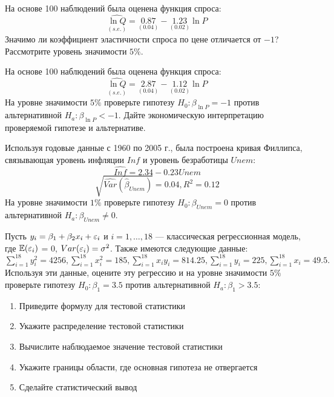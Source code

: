 \documentclass[pdftex,11pt,openany]{book}
\begin{document}
\begin{solution}
\end{solution}


\begin{problem} На основе 100 наблюдений была оценена функция спроса:
\[
\underset{(s.e.)}{\widehat{\ln Q}} = \underset{(0.04)}{0.87} - \underset{(0.02)}{1.23}\ln P
\]
Значимо ли коэффициент эластичности спроса по цене отличается от $-1$? Рассмотрите уровень значимости $5\%$.
\end{problem}

\begin{solution}
\end{solution}


\begin{problem}
 На основе 100 наблюдений была оценена функция спроса: 
\[
\underset{(s.e.)}{\widehat{\ln Q}} = \underset{(0.04)}{2.87} - \underset{(0.02)}{1.12}\ln P
\]
На уровне значимости $5\%$ проверьте гипотезу  $H_0: \beta_{\ln P} = - 1$ против альтернативной $H_a: \beta_{\ln P} < -1$. Дайте экономическую интерпретацию проверяемой гипотезе и альтернативе.
\end{problem}

\begin{solution}
\end{solution}


\begin{problem}
 Используя годовые данные с 1960 по 2005 г., была построена кривая Филлипса, связывающая уровень инфляции $Inf$ и уровень безработицы $Unem$: 
\[
\widehat{Inf} = 2.34 - 0.23Unem 
\]
\[
\sqrt{\widehat{Var}(\hat{\beta}_{Unem})} = 0.04, R^2 = 0.12
\]
На уровне значимости $1\%$ проверьте гипотезу  $H_0: \beta_{Unem} = 0$ против альтернативной $H_a: \beta_{Unem} \not= 0$.
\end{problem}

\begin{solution}
\end{solution}


\begin{problem}
 Пусть $y_i = \beta_1 + \beta_2 x_i + \varepsilon_i$ и $i = 1, \dots, 18$ --- классическая регрессионная модель, где $\mathbb{E}(\varepsilon_i)$ = 0, $Var(\varepsilon_i) = \sigma^2$. Также имеются следующие данные: $\sum_{i=1}^{18} y_i^2 = 4256, \sum_{i=1}^{18} x_i^2 = 185, \sum_{i=1}^{18} x_iy_i = 814.25, \sum_{i=1}^{18} y_i = 225, \sum_{i=1}^{18} x_i = 49.5.$ Используя эти данные, оцените эту регрессию и на уровне значимости $5\%$ проверьте гипотезу $H_0: \beta_1 = 3.5$ против альтернативной $H_a: \beta_1 > 3.5$:
\begin{enumerate}
\item Приведите формулу для тестовой статистики 
\item Укажите распределение тестовой статистики
\item Вычислите наблюдаемое значение тестовой статистики
\item Укажите границы области, где основная гипотеза не отвергается
\item Сделайте статистический вывод
\end{enumerate}
\end{problem}
\end{document}
